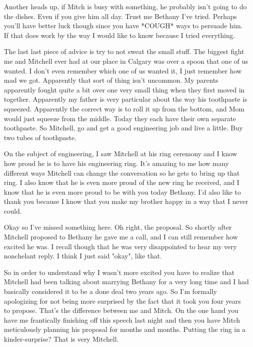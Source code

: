 Another heads up, if Mitch is busy with something, he probably isn't going to do the dishes. Even if you give him all day. Trust me Bethany I've tried. Perhaps you'll have better luck though since you have *COUGH* ways to persuade him. If that does work by the way I would like to know because I tried everything.

The last last piece of advice is try to not sweat the small stuff. The biggest fight me and Mitchell ever had at our place in Calgary was over a spoon that one of us wanted. I don't even remember which one of us wanted it, I just remember how mad we got. Apparently that sort of thing isn't uncommon. My parents apparently fought quite a bit over one very small thing when they first moved in together. Apparently my father is very particular about the way his toothpaste is squeezed. Apparently the correct way is to roll it up from the bottom, and Mom would just squeeze from the middle. Today they each have their own separate toothpaste. So Mitchell, go and get a good engineering job and live a little. Buy two tubes of toothpaste.

On the subject of engineering, I saw Mitchell at his ring ceremony and I know how proud he is to have his engineering ring. It's amazing to me how many different ways Mitchell can change the conversation so he gets to bring up that ring. I also know that he is even more proud of the new ring he received, and I know that he is even more proud to be with you today Bethany. I'd also like to thank you because I know that you make my brother happy in a way that I never could.

Okay so I've missed something here. Oh right, the proposal. So shortly after Mitchell proposed to Bethany he gave me a call, and I can still remember how excited he was. I recall though that he was very disappointed to hear my very nonchelant reply. I think I just said "okay", like that.

So in order to understand why I wasn't more excited you have to realize that Mitchell had been talking about marrying Bethany for a very long time and I had basically considered it to be a done deal two years ago. So I'm formally apologizing for not being more surprised by the fact that it took you four years to propose. That's the difference between me and Mitch. On the one hand you have me frantically finishing off this speech last night and then you have Mitch meticulously planning his proposal for months and months. Putting the ring in a kinder-surprise? That is very Mitchell.

